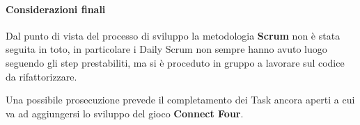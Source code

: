 \paragraph{Considerazioni finali}
Dal punto di vista del processo di sviluppo la metodologia \textbf{Scrum} non è stata seguita in toto, in particolare i Daily Scrum non sempre hanno avuto luogo seguendo gli step prestabiliti, ma si è proceduto in gruppo a lavorare sul codice da rifattorizzare.

Una possibile prosecuzione prevede il completamento dei Task ancora aperti a cui va ad aggiungersi lo sviluppo del gioco \textbf{Connect Four}.